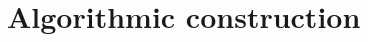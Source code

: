 \section{Algorithmic construction}
\label{sec:main-algorithm}

\newcommand{\MainAlgoBlockTarget}[1]{%
  \hypertarget{main-algo-block-#1}{\AlgoBlockHeading{#1}}}
\newcommand{\MainAlgoInlineTarget}[1]{%
  \hypertarget{main-algo-block-#1}{%
    \textbf{\AlgoStepPrefix~\AlgoBlockCode{#1}. \AlgoBlockName{#1}.}}}
\newcommand{\MainAlgoShortTarget}[1]{%
  \hypertarget{main-algo-block-#1}{\textbf{\AlgoStepPrefix~\AlgoBlockCode{#1}.}}}
\DeclareRobustCommand{\MainAlgoBlockRef}[1]{%
  \hyperlink{main-algo-block-#1}{\AlgoStepPrefix~\AlgoBlockCode{#1}}}

